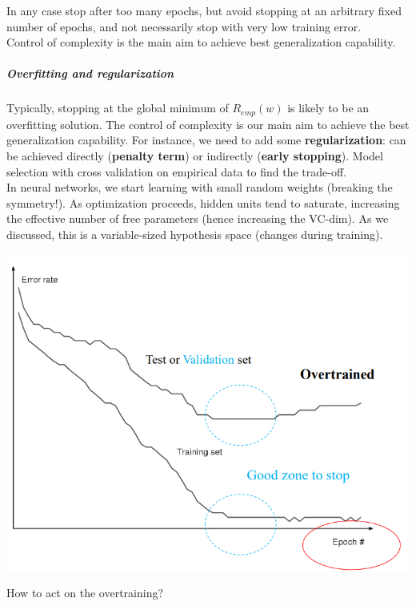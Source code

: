 \documentclass[10pt]{report}
\begin{document}
In any case stop after too many epochs, but avoid stopping at an arbitrary fixed number of epochs, and not necessarily stop with very low training error.\\
Control of complexity is the main aim to achieve best generalization capability.
\subparagraph{Overfitting and regularization} Typically, stopping at the global minimum of $R_{emp}(w)$ is likely to be an overfitting solution. The control of complexity is our main aim to achieve the best generalization capability. For instance, we need to add some \textbf{regularization}: can be achieved directly (\textbf{penalty term}) or indirectly (\textbf{early stopping}). Model selection with cross validation on empirical data to find the trade-off.\\
In neural networks, we start learning with small random weights (breaking the symmetry!). As optimization proceeds, hidden units tend to saturate, increasing the effective number of free parameters (hence increasing the VC-dim). As we discussed, this is a variable-sized hypothesis space (changes during training).
\begin{center}
	\includegraphics[scale=0.5]{8.png}
\end{center}
How to act on the overtraining?
\end{document}

